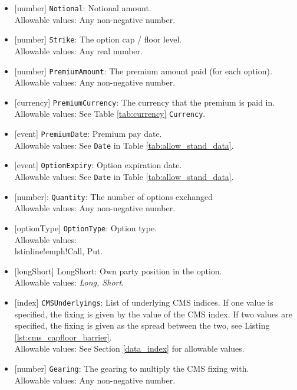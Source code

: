 \begin{itemize} 
  \item{}[number] \lstinline!Notional!: Notional amount. \\
  Allowable values: Any non-negative number.
  \item{}[number] \lstinline!Strike!: The option cap / floor level. \\
  Allowable values: Any real number.
  \item{}[number] \lstinline!PremiumAmount!: The premium amount paid (for each option). \\
  Allowable values: Any non-negative number.
  \item{}[currency] \lstinline!PremiumCurrency!: The currency that the premium is paid in. \\
  Allowable values: See Table \ref{tab:currency} \lstinline!Currency!.
  \item{}[event] \lstinline!PremiumDate!: Premium pay date. \\
  Allowable values: See \lstinline!Date! in Table \ref{tab:allow_stand_data}.
  \item{}[event] \lstinline!OptionExpiry!: Option expiration date. \\
  Allowable values: See \lstinline!Date! in Table \ref{tab:allow_stand_data}.
  \item{}[number]: \lstinline!Quantity!: The number of options exchanged \\
  Allowable values: Any non-negative number.
  \item{}[optionType] \lstinline!OptionType!: Option type. \\
  Allowable values: \\lstinline!emph!{Call, Put}.
  \item{}[longShort] LongShort: Own party position in the option. \\
  Allowable values: \emph{Long, Short}.
  \item{}[index] \lstinline!CMSUnderlyings!: List of underlying CMS indices. If one value is specified, the fixing is given by
  the value of the CMS index. If two values are specified, the fixing is given as the spread between the two, see
  Listing \ref{lst:cms_capfloor_barrier}.\\
  Allowable values: See Section \ref{data_index} for allowable values.
  \item{}[number] \lstinline!Gearing!: The gearing to multiply the CMS fixing with.\\
  Allowable values: Any non-negative number.

\end{itemize}
